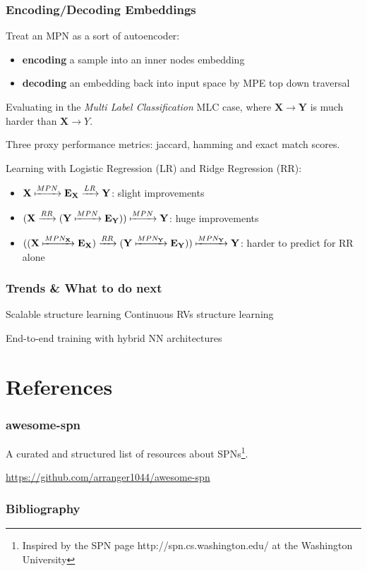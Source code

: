 \documentclass[10pt, t, xcolor={usenames,dvipsnames,svgnames}, compress]{beamer}
\begin{document}
\begin{frame}
  \frametitle{Encoding/Decoding Embeddings}
  Treat an MPN as a sort of autoencoder:
  \begin{itemize}
  \item \textbf{encoding} a sample into an inner nodes embedding
     \item \textbf{decoding} an embedding back into input space by MPE top
      down traversal
  \end{itemize}


  Evaluating in the \emph{Multi Label Classification} MLC case, where
  $\mathbf{X}\rightarrow\mathbf{Y}$ is much harder than
  $\mathbf{X}\rightarrow Y$.\par
  Three proxy performance metrics: jaccard, hamming and exact match
  scores.\par
  Learning with Logistic Regression (LR)
  and Ridge Regression (RR):
  \begin{itemize}
  \item $\mathbf{X}
    \xmapsto{MPN}\mathbf{E}_{\mathbf{X}}\xrightarrow{LR}\mathbf{Y}$:
    slight improvements
  \item
    $(\mathbf{X}\xrightarrow{RR}(\mathbf{Y}\xmapsto{MPN}\mathbf{E}_{\mathbf{Y}}))\xmapsto{MPN}\mathbf{Y}$:
    huge improvements
  \item
    $((\mathbf{X}\xmapsto{MPN_{\mathbf{X}}}\mathbf{E}_{\mathbf{X}})\xrightarrow{RR}(\mathbf{Y}\xmapsto{MPN_{\mathbf{Y}}}\mathbf{E}_{\mathbf{Y}}))\xmapsto{MPN_{\mathbf{Y}}}\mathbf{Y}$:
    harder to predict for RR alone
  \end{itemize}
\end{frame}





\begin{frame}
  \frametitle{Trends \& What to do next}
  Scalable structure learning
  Continuous RVs structure learning

  End-to-end training with hybrid NN architectures
\end{frame}

\section{References}
{
  \begin{frame}[c]
    \sectionpage
  \end{frame}
}

\begin{frame}
  \frametitle{awesome-spn}
  A curated and structured list of resources about SPNs\footnote{Inspired by the
    SPN page {http://spn.cs.washington.edu/} at the Washington  University}.

  \url{https://github.com/arranger1044/awesome-spn}
\end{frame}

\begin{frame} [allowframebreaks]
  \frametitle{Bibliography}
  \setlength\bibitemsep{2pt}
  \printbibliography
\end{frame}
\end{document}
